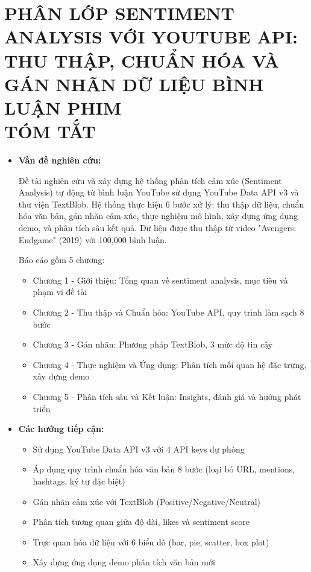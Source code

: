 \section*{PHÂN LỚP SENTIMENT ANALYSIS VỚI YOUTUBE API: \\ THU THẬP, CHUẨN HÓA VÀ GÁN NHÃN DỮ LIỆU BÌNH LUẬN PHIM \\TÓM TẮT}

\begin{itemize}
    \item[-] \textbf{Vấn đề nghiên cứu:}
    
    Đề tài nghiên cứu và xây dựng hệ thống phân tích cảm xúc (Sentiment Analysis) tự động từ bình luận YouTube sử dụng YouTube Data API v3 và thư viện TextBlob. Hệ thống thực hiện 6 bước xử lý: thu thập dữ liệu, chuẩn hóa văn bản, gán nhãn cảm xúc, thực nghiệm mô hình, xây dựng ứng dụng demo, và phân tích sâu kết quả. Dữ liệu được thu thập từ video "Avengers: Endgame" (2019) với 100,000 bình luận.
    
    Báo cáo gồm 5 chương:
        \begin{itemize}
        \item[•] Chương 1 - Giới thiệu: Tổng quan về sentiment analysis, mục tiêu và phạm vi đề tài
        \item[•] Chương 2 - Thu thập và Chuẩn hóa: YouTube API, quy trình làm sạch 8 bước
        \item[•] Chương 3 - Gán nhãn: Phương pháp TextBlob, 3 mức độ tin cậy
        \item[•] Chương 4 - Thực nghiệm và Ứng dụng: Phân tích mối quan hệ đặc trưng, xây dựng demo
        \item[•] Chương 5 - Phân tích sâu và Kết luận: Insights, đánh giá và hướng phát triển
        \end{itemize}
        
    \item[-] \textbf{Các hướng tiếp cận:}
        \begin{itemize}
        \item[•] Sử dụng YouTube Data API v3 với 4 API keys dự phòng
        \item[•] Áp dụng quy trình chuẩn hóa văn bản 8 bước (loại bỏ URL, mentions, hashtags, ký tự đặc biệt)
        \item[•] Gán nhãn cảm xúc với TextBlob (Positive/Negative/Neutral)
        \item[•] Phân tích tương quan giữa độ dài, likes và sentiment score
        \item[•] Trực quan hóa dữ liệu với 6 biểu đồ (bar, pie, scatter, box plot)
        \item[•] Xây dựng ứng dụng demo phân tích văn bản mới
        \end{itemize}
        

\end{itemize}
